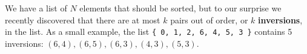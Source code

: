 We have a list of $N$ elements that should be sorted, but to our surprise we
recently discovered that there are at most $k$ pairs out of order, or $k$
\textbf{inversions}, in the list. As a small example, the list
\lstinline${ 0, 1, 2, 6, 4, 5, 3 }$ contains 5 inversions:
$(6, 4), (6, 5), (6, 3), (4, 3), (5, 3)$.
